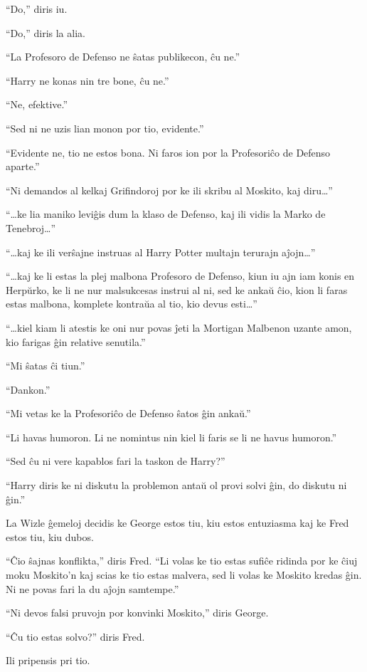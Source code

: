 ``Do,'' diris iu.

``Do,'' diris la alia.

``La Profesoro de Defenso ne ŝatas publikecon, ĉu ne.''

``Harry ne konas nin tre bone, ĉu ne.''

``Ne, efektive.''

``Sed ni ne uzis lian monon por tio, evidente.''

``Evidente ne, tio ne estos bona. Ni faros ion por la Profesoriĉo de Defenso aparte.''

``Ni demandos al kelkaj Grifindoroj por ke ili skribu al Moskito, kaj diru\ldots{}''

``\ldots{}ke lia maniko leviĝis dum la klaso de Defenso, kaj ili vidis la
Marko de Tenebroj\ldots{}''

``\ldots{}kaj ke ili verŝajne instruas al Harry Potter multajn
terurajn aĵojn\ldots{}''

``\ldots{}kaj ke li estas la plej malbona Profesoro de Defenso, kiun
iu ajn iam konis en Herpŭrko, ke li ne nur malsukcesas instrui al ni,
sed ke ankaŭ ĉio, kion li faras estas malbona, komplete kontraŭa al
tio, kio devus esti\ldots{}''

``\ldots{}kiel kiam li atestis ke oni nur povas ĵeti la Mortigan
Malbenon uzante amon, kio farigas ĝin relative senutila.''

``Mi ŝatas ĉi tiun.''

``Dankon.''

``Mi vetas ke la Profesoriĉo de Defenso ŝatos ĝin ankaŭ.''

``Li havas humoron. Li ne nomintus nin kiel li faris se li ne havus
humoron.''

``Sed ĉu ni vere kapablos fari la taskon de Harry?''

``Harry diris ke ni diskutu la problemon antaŭ ol provi solvi ĝin, do
diskutu ni ĝin.''

La Wizle ĝemeloj decidis ke George estos tiu, kiu estos entuziasma kaj
ke Fred estos tiu, kiu dubos.

``Ĉio ŝajnas konflikta,'' diris Fred. ``Li volas ke tio estas sufiĉe
ridinda por ke ĉiuj moku Moskito'n kaj scias ke tio estas malvera, sed
li volas ke Moskito kredas ĝin. Ni ne povas fari la du aĵojn
samtempe.''


``Ni devos falsi pruvojn por konvinki Moskito,'' diris George.

``Ĉu tio estas solvo?'' diris Fred.

Ili pripensis pri tio.

